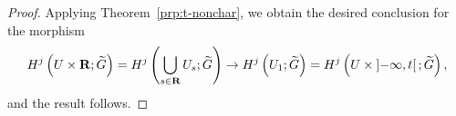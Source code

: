 \begin{proof}
  Applying Theorem~\ref{prp:t-nonchar}, 
  we obtain the desired conclusion for the morphism
  \[
    H^{j}\left(U\times \mathbf{R};\widetilde{G}\right)
    =
    H^{j}\left(\bigcup_{s\in\mathbf{R}}U_{s};\widetilde{G}\right)
    \to
    H^{j}\left(U_{1};\widetilde{G}\right)
    =
    H^{j}\left(U\times \left]-\infty,t\right[ ;\widetilde{G}\right),
  \]
  and the result follows.

\end{proof}
